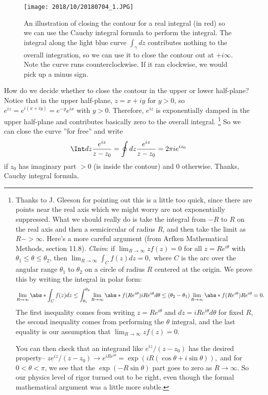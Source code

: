 \begin{figure}\label{fig_contour}
\texttt{[image: 2018/10/20180704\_1.JPG]}
\caption{An illustration of closing the contour for a real integral (in red) so we can use the Cauchy integral formula to perform the integral. The integral along the light blue curve $\int_\gamma dz$ contributes nothing to the overall integration, so we can use it to close the contour out at $+i\infty$. Note the curve runs counterclockwise. If it ran clockwise, we would pick up a minus sign.}
\end{figure}

How do we decide whether to close the contour in the upper or lower half-plane? Notice that in the upper half-plane, $z=x+iy$ for $y>0$, so $e^{iz}=e^{i(x+iy)}=e^{-y}e^{ix}$ with $y>0$. Therefore, $e^{iz}$ is exponentially damped in the upper half-plane and contributes basically zero to the overall integral.%
    \footnote{Thanks to J. Gleeson for pointing out this is a little too quick, since there are points near the real axis which we might worry are not exponentially suppressed. What we should really do is take the integral from $-R$ to $R$ on the real axis and then a semicircular of radius $R$, and then take the limit as $R->\infty$. Here's a more careful argument (from Arfken Mathematical Methods, section 11.8). \emph{Claim}: if $\lim_{R\to \infty} zf(z) =0$ for all $z=Re^{i\theta}$ with $\theta_1\leq \theta\leq \theta_2$, then $\lim_{R\to \infty} \int_C f(z)dz=0,$ where $C$ is the arc over the angular range $\theta_1$ to $\theta_2$ on a circle of radius $R$ centered at the origin. We prove this by writing the integral in polar form:
    \begin{equation*}
        \lim_{R\to\infty} \abs*{\int_C f(z) dz} \leq \int_{\theta_1}^{\theta_2} \lim_{R\to \infty} \abs*{f(Re^{i\theta})iRe^{i\theta}}d\theta \leq (\theta_2-\theta_1) \lim_{R\to\infty}\abs*{f(Re^{i\theta})Re^{i\theta}}=0.
    \end{equation*}
    The first inequality comes from writing $z=Re^{i\theta}$ and $dz=iRe^{i\theta}d\theta$ for fixed $R$, the second inequality comes from performing the $\theta$ integral, and the last equality is our assumption that $\lim_{R\to \infty} zf(z)=0$.
    
    You can then check that an integrand like $e^{iz}/(z-z_0)$ has the desired property-- $ze^{iz}/(z-z_0) \to e^{i Re^{i\theta}}= \exp(iR (\cos\theta + i \sin\theta)),$ and for $0<\theta<\pi$, we see that the $\exp(-R\sin\theta)$ part goes to zero as $R\to\infty$. So our physics level of rigor turned out to be right, even though the formal mathematical argument was a little more subtle.
    }
So we can close the curve ''for free'' and write
$$\Int dz \frac{e^{iz}}{z-z_0}=\oint dz \frac{e^{iz}}{z-z_0}=2\pi i e^{iz_0}$$
if $z_0$ has imaginary part $>0$ (is inside the contour) and $0$ otherwise. Thanks, Cauchy integral formula.


